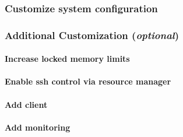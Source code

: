 \documentclass[letterpaper]{article}
\begin{document}
\vspace*{-0.25cm}
\subsubsection{Customize system configuration} \label{sec:master_customization}




\subsubsection{Additional Customization ({\em optional})} \label{sec:addl_customizations}


\paragraph{Increase locked memory limits}


\paragraph{Enable ssh control via resource manager} 


\paragraph{Add \Lustre{} client} \label{sec:lustre_client}




\paragraph{Add \Nagios{} monitoring} \label{sec:add_nagios}

\end{document}
